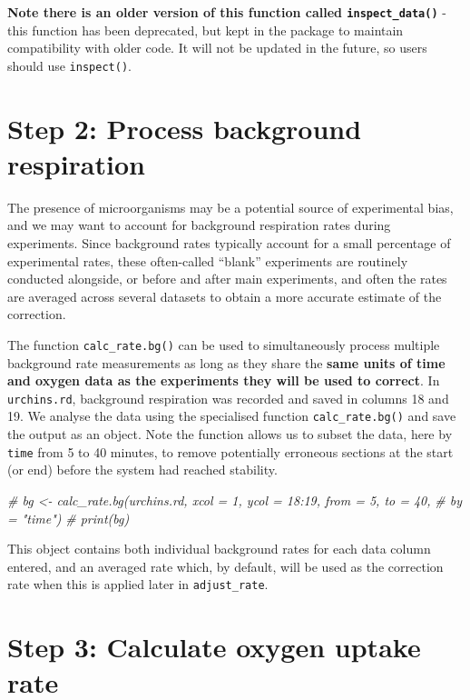 \documentclass[]{book}
\newenvironment{Shaded}{\begin{snugshade}}{\end{snugshade}}
\newcommand{\CommentTok}[1]{\textcolor[rgb]{0.56,0.35,0.01}{\textit{#1}}}
\begin{document}
\textbf{Note there is an older version of this function called
\texttt{inspect\_data()}} - this function has been deprecated, but kept
in the package to maintain compatibility with older code. It will not be
updated in the future, so users should use \texttt{inspect()}.

\section{Step 2: Process background
respiration}\label{step-2-process-background-respiration}

The presence of microorganisms may be a potential source of experimental
bias, and we may want to account for background respiration rates during
experiments. Since background rates typically account for a small
percentage of experimental rates, these often-called ``blank''
experiments are routinely conducted alongside, or before and after main
experiments, and often the rates are averaged across several datasets to
obtain a more accurate estimate of the correction.

The function \texttt{calc\_rate.bg()} can be used to simultaneously
process multiple background rate measurements as long as they share the
\textbf{same units of time and oxygen data as the experiments they will
be used to correct}. In \texttt{urchins.rd}, background respiration was
recorded and saved in columns 18 and 19. We analyse the data using the
specialised function \texttt{calc\_rate.bg()} and save the output as an
object. Note the function allows us to subset the data, here by
\texttt{time} from 5 to 40 minutes, to remove potentially erroneous
sections at the start (or end) before the system had reached stability.

\begin{Shaded}
\begin{Highlighting}[]
\CommentTok{# bg <- calc_rate.bg(urchins.rd, xcol = 1, ycol = 18:19, from = 5, to = 40, }
\CommentTok{#   by = "time")}
\CommentTok{# print(bg)}
\end{Highlighting}
\end{Shaded}

This object contains both individual background rates for each data
column entered, and an averaged rate which, by default, will be used as
the correction rate when this is applied later in \texttt{adjust\_rate}.

\section{Step 3: Calculate oxygen uptake
rate}\label{step-3-calculate-oxygen-uptake-rate}
\end{document}
